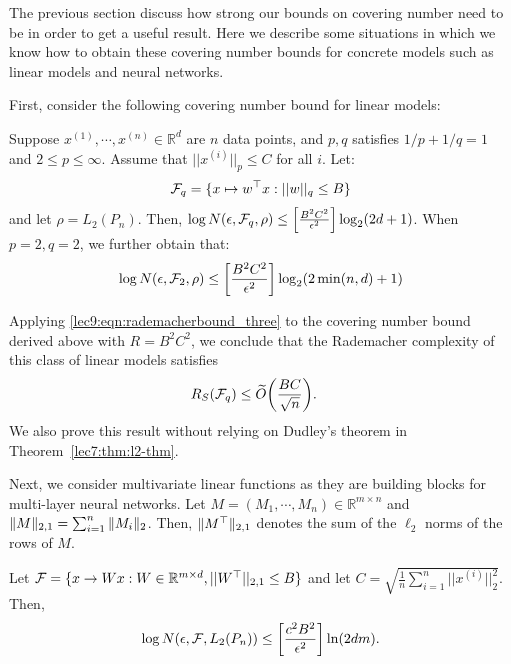 \label{sec:deep_nets}
The previous section discuss how strong our bounds on covering number need to be in order to get a useful result. 
Here we describe some situations in which we know how to obtain these covering number bounds for concrete models such as linear models and neural networks. 

First, consider the following covering number bound for linear models:

\begin{theorem} \label{lec9:thm:univariate_rad}
Suppose $x^{(1)}, \cdots, x^{(n)} \in \mathbb{R}^d$ are $n$ data points, and $p, q$ satisfies $1/p + 1/q = 1$ and $2 \le p \le \infty$. Assume that $||x^{(i)}||_p \le C$ for all $i$. Let:
\begin{align}
    \mathcal F_q = \{x \mapsto w^\top x : ||w||_q \le B\}
\end{align}
and let $\rho = L_2(P_n)$. Then, $\log N(\epsilon, \mathcal F_q, \rho) \le \left [\frac{B^2C^2}{\epsilon^2}\right ] \log_2 (2d + 1)$. When $p = 2, q = 2$, we further obtain that:
\begin{align}
    \log N(\epsilon, \mathcal F_2, \rho) \le \left [\frac{B^2C^2}{\epsilon^2} \right ] \log_2 (2 \min (n, d ) + 1)
\end{align}
\end{theorem}
\begin{remark}
Applying \eqref{lec9:eqn:rademacherbound_three} to the covering number bound derived above with $R = B^2C^2$, we conclude that the Rademacher complexity of this class of linear models satisfies
\begin{align}
    R_S(\mathcal F_q) &\le \widetilde{O}{\left( \frac{BC}{\sqrt{n}} \right)}.
\end{align} 
We also prove this result without relying on Dudley's theorem in Theorem~\ref{lec7:thm:l2-thm}.
\end{remark}
Next, we consider multivariate linear functions as they are building blocks for multi-layer neural networks. Let $M = (M_1, \cdots, M_n) \in \mathbb{R}^{m \times n}$ and $\|M\|_{2,1} = \sum_{i = 1}^n \|M_i\|_2$. Then, $\|M^\top\|_{2,1}$ denotes the sum of the $\ell_2$ norms of the rows of $M$. 
\begin{theorem}\label{lec9:thm:multivariate_rad}
Let $\mathcal F = \{x \to Wx : W \in \mathbb{R}^{m \times d}, ||W^\top||_{2, 1} \le B\}$ and let $C = \sqrt{\frac{1}{n} \sum_{i = 1}^n ||x^{(i)}||_2^2}$. Then, 
\begin{equation}
\log N(\epsilon, \mathcal F, L_2(P_n)) \le \left [\frac{c^2B^2}{\epsilon^2} \right ] \ln (2dm).
\end{equation}
\end{theorem}
